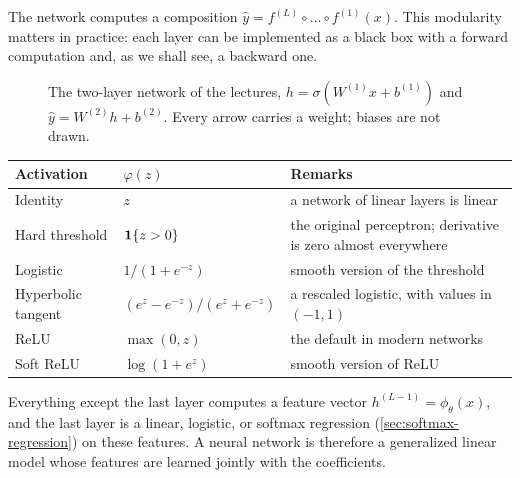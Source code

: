 The network computes a composition $\hat y=f^{(L)}\circ\dots\circ f^{(1)}(x)$. This modularity matters in practice: each layer can be implemented as a black box with a forward computation and, as we shall see, a backward one.

\begin{figure}[ht]
\centering
{}
\caption{The two-layer network of the lectures, $h=\sigma(W^{(1)}x+b^{(1)})$ and $\hat y=W^{(2)}h+b^{(2)}$. Every arrow carries a weight; biases are not drawn.}
\label{fig:two-layer-net}
\end{figure}

\begin{center}
\small
\begin{tabular}{@{}lll@{}}
\toprule
Activation & $\varphi(z)$ & Remarks \\
\midrule
Identity & $z$ & a network of linear layers is linear \\
Hard threshold & $\mathbf{1}\{z>0\}$ & the original perceptron; derivative is zero almost everywhere \\
Logistic & $1/(1+e^{-z})$ & smooth version of the threshold \\
Hyperbolic tangent & $(e^z-e^{-z})/(e^z+e^{-z})$ & a rescaled logistic, with values in $(-1,1)$ \\
ReLU & $\max(0,z)$ & the default in modern networks \\
Soft ReLU & $\log(1+e^z)$ & smooth version of ReLU \\
\bottomrule
\end{tabular}
\end{center}

\begin{remark}
Everything except the last layer computes a feature vector $h^{(L-1)}=\phi_\theta(x)$, and the last layer is a linear, logistic, or softmax regression (\cref{sec:softmax-regression}) on these features. A neural network is therefore a generalized linear model whose features are learned jointly with the coefficients.
\end{remark}

